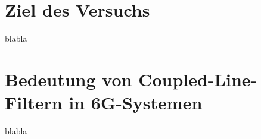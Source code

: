 \section{Ziel des Versuchs}
    blabla
\section{Bedeutung von Coupled-Line-Filtern in 6G-Systemen}
    blabla
    
\clearpage
